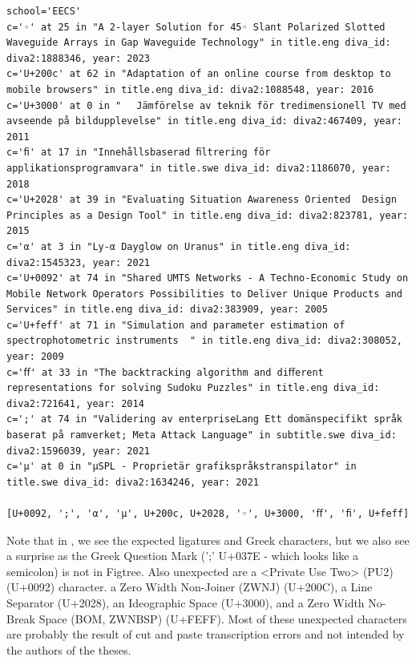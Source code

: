 \documentclass[12pt, twoside]{article}
\begin{document}
\begin{lstlisting}[style=latexExampleForAuthors,  escapechar=|, 
caption={Part of the output about characters missing from Figtree that are actually used in \gls{DiVA} in English and Swedish titles and subtitles - for the EECS school.},
label=lst:missingFigtreeEECS]
\end{lstlisting}
\begin{Verbatim}[breaklines=true, commandchars=\\\{\}]
school='EECS'
c='◦' at 25 in "A 2-layer Solution for 45◦ Slant Polarized Slotted Waveguide Arrays in Gap Waveguide Technology" in title.eng diva_id: diva2:1888346, year: 2023
c='U+200c' at 62 in "Adaptation of an online course from desktop to mobile browsers‌‌" in title.eng diva_id: diva2:1088548, year: 2016
c='U+3000' at 0 in "　 Jämförelse av teknik för tredimensionell TV med avseende på bildupplevelse" in title.eng diva_id: diva2:467409, year: 2011
c='ﬁ' at 17 in "Innehållsbaserad ﬁltrering för applikationsprogramvara" in title.swe diva_id: diva2:1186070, year: 2018
c='U+2028' at 39 in "Evaluating Situation Awareness Oriented  Design Principles as a Design Tool" in title.eng diva_id: diva2:823781, year: 2015
c='α' at 3 in "Ly-α Dayglow on Uranus" in title.eng diva_id: diva2:1545323, year: 2021
c='U+0092' at 74 in "Shared UMTS Networks - A Techno-Economic Study on Mobile Network Operators Possibilities to Deliver Unique Products and Services" in title.eng diva_id: diva2:383909, year: 2005
c='U+feff' at 71 in "Simulation and parameter estimation of spectrophotometric instruments  ﻿" in title.eng diva_id: diva2:308052, year: 2009
c='ﬀ' at 33 in "The backtracking algorithm and diﬀerent representations for solving Sudoku Puzzles" in title.eng diva_id: diva2:721641, year: 2014
c=';' at 74 in "Validering av enterpriseLang Ett domänspecifikt språk baserat på ramverket; Meta Attack Language" in subtitle.swe diva_id: diva2:1596039, year: 2021
c='μ' at 0 in "μSPL - Proprietär grafikspråkstranspilator" in title.swe diva_id: diva2:1634246, year: 2021

[U+0092, ';', 'α', 'μ', U+200c, U+2028, '◦', U+3000, 'ﬀ', 'ﬁ', U+feff]
\end{Verbatim}
\FloatBarrier

Note that in , we see the expected ligatures and Greek characters, but we also see a surprise as the Greek Question Mark (';' U+037E - which looks like a semicolon) is not in Figtree. Also unexpected are a <Private Use Two> (PU2) (U+0092) character. a Zero Width Non-Joiner (ZWNJ) (U+200C), a Line Separator (U+2028), an Ideographic Space (U+3000), and a Zero Width No-Break Space (BOM, ZWNBSP) (U+FEFF). Most of these unexpected characters are probably the result of cut and paste transcription errors and not intended by the authors of the theses.
\end{document}
